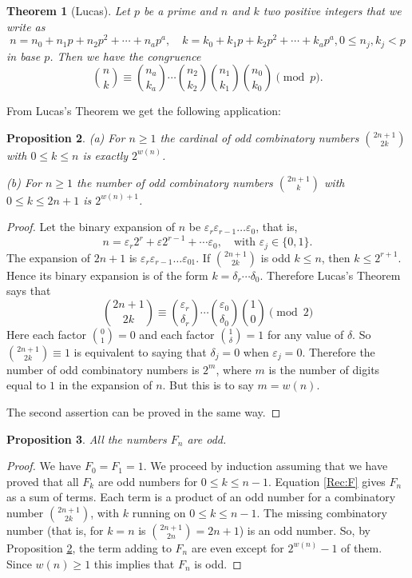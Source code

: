 \documentclass[10pt]{amsart}
\newtheorem{thm}{Theorem}
\newtheorem{prop}[thm]{Proposition}
\theoremstyle{definition}
\theoremstyle{remark}
\begin{document}
\begin{thm}[Lucas]
Let $p$ be a prime and $n$ and $k$ two positive integers that we write as
\[n=n_0+n_1p+n_2p^2+\cdots+n_a p^a,\quad k=k_0+k_1p+k_2p^2+\cdots+k_a p^a, 0\le n_j,k_j<p\]
in base $p$.  Then we have the congruence
\[\binom{n}{k}\equiv\binom{n_a}{k_a}\cdots\binom{n_2}{k_2}\binom{n_1}{k_1}\binom{n_0}{k_0}
\pmod{p}.\]
\end{thm}

From Lucas's Theorem we get the following application:
\begin{prop}\label{P:afterLucas}
(a) For $n\ge1$ the cardinal of odd combinatory numbers $\binom{2n+1}{2k}$ 
with $0\le k\le n$ is exactly $2^{w(n)}$.

(b) For $n\ge 1$ the number of odd combinatory numbers $\binom{2n+1}{k}$ 
with $0\le k\le 2n+1$ is  $2^{w(n)+1}$.

\end{prop}

\begin{proof}
Let the binary expansion of $n$ be $\varepsilon_r\varepsilon_{r-1}\dots\varepsilon_0$, that is, 
\[n=\varepsilon_r2^r+\varepsilon2^{r-1}+\cdots \varepsilon_0,\quad \text{with }
\varepsilon_j\in\{0,1\}.\]
The expansion of $2n+1$ is $\varepsilon_r\varepsilon_{r-1}\dots\varepsilon_01$.
If $\binom{2n+1}{2k}$ is odd $k\le n$, then $k\le 2^{r+1}$. Hence its 
binary expansion is
of the form $k=\delta_r\cdots \delta_0$. Therefore Lucas's Theorem says that
\[\binom{2n+1}{2k}\equiv \binom{\varepsilon_r}{\delta_r}\cdots
\binom{\varepsilon_0}{\delta_0}\binom{1}{0}\pmod{2}\]
Here each factor $\binom{0}{1}=0$ and each factor $\binom{1}{\delta}=1$ for
any value of $\delta$.  So $\binom{2n+1}{2k}\equiv1$ is equivalent to saying that
$ \delta_j=0$ when $\varepsilon_j=0$. Therefore the number of odd combinatory 
numbers is $2^{m}$, where $m$ is the number of digits equal to $1$ in 
the expansion of $n$. But 
this is to say $m=w(n)$. 

The second assertion can be proved in the same way.
\end{proof}

\begin{prop}
All the numbers $F_n$  are odd. 
\end{prop}

\begin{proof}
We have $F_0=F_1=1$. We proceed by induction assuming that we have proved that
all $F_k$ are odd numbers for $0\le k\le n-1$. 
Equation \eqref{Rec:F} gives $F_n$ as a sum of terms. Each term is a product 
of an odd number for a combinatory number $\binom{2n+1}{2k}$, with $k$ running on 
$0\le k\le n-1$. The missing combinatory number 
(that is, for $k=n$ is $\binom{2n+1}{2n}=2n+1$) is an 
odd number. So, by Proposition \ref{P:afterLucas}, the term adding to $F_n$ are even except for $2^{w(n)}-1$ of them. Since 
$w(n)\ge1$ this implies that $F_n$ is odd.
\end{proof}
\end{document}
